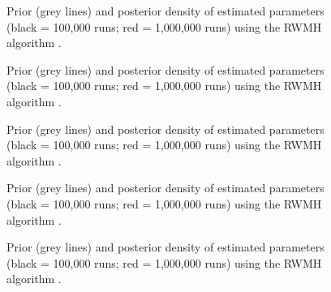 \documentclass[12pt,a4paper,pdftex]{article}
\begin{document}

%
%


\newpage
\begin{figure}
\begin{centering}
  \epsfxsize=300pt 
  \caption{Prior (grey lines) and posterior density of estimated parameters (black = 100,000 runs; red = 1,000,000 runs) using the RWMH algorithm \citep[QUEST III model][]{Ratto_et_al_EconModel2009}.}\label{fig:quest_RWMH_comp1}
\end{centering}
\end{figure}
\begin{figure}
\begin{centering}
  \epsfxsize=300pt 
  \caption{Prior (grey lines) and posterior density of estimated parameters (black = 100,000 runs; red = 1,000,000 runs) using the RWMH algorithm \citep[QUEST III model][]{Ratto_et_al_EconModel2009}.}\label{fig:quest_RWMH_comp2}
\end{centering}
\end{figure}
\begin{figure}
\begin{centering}
  \epsfxsize=300pt 
  \caption{Prior (grey lines) and posterior density of estimated parameters (black = 100,000 runs; red = 1,000,000 runs) using the RWMH algorithm \citep[QUEST III model][]{Ratto_et_al_EconModel2009}.}\label{fig:quest_RWMH_comp3}
\end{centering}
\end{figure}
\begin{figure}
\begin{centering}
  \epsfxsize=300pt 
  \caption{Prior (grey lines) and posterior density of estimated parameters (black = 100,000 runs; red = 1,000,000 runs) using the RWMH algorithm \citep[QUEST III model][]{Ratto_et_al_EconModel2009}.}\label{fig:quest_RWMH_comp4}
\end{centering}
\end{figure}
\begin{figure}
\begin{centering}
  \epsfxsize=300pt 
  \caption{Prior (grey lines) and posterior density of estimated parameters (black = 100,000 runs; red = 1,000,000 runs) using the RWMH algorithm \citep[QUEST III model][]{Ratto_et_al_EconModel2009}.}\label{fig:quest_RWMH_comp5}
\end{centering}
\end{figure}
\end{document}
